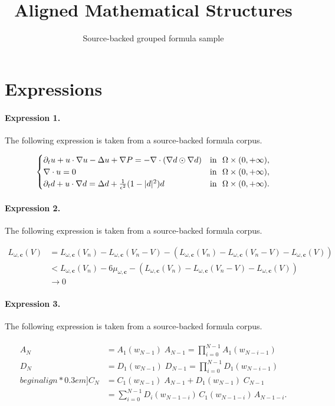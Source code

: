 \documentclass[11pt]{article}
\title{Aligned Mathematical Structures}
\author{Source-backed grouped formula sample}
\date{}
\begin{document}
\maketitle
\section{Expressions}
\paragraph{Expression 1.} The following expression is taken from a source-backed formula corpus.

\begin{align*}\begin{cases}\partial_t u+u\cdot\nabla u-\Delta u+\nabla P=-\nabla\cdot(\nabla d\odot \nabla d) & {\rm{in}}\ \ \Omega\times (0,+\infty),\\\nabla\cdot u = 0 & {\rm{in}}\ \ \Omega\times (0,+\infty),\\\partial_t d+u\cdot\nabla d=\Delta d+\frac{1}{\epsilon^2}(1-|d|^2) d & {\rm{in}}\ \ \Omega\times (0,+\infty).\end{cases}\end{align*}

\paragraph{Expression 2.} The following expression is taken from a source-backed formula corpus.

\begin{align*}L_{\omega,\mathbf{c}}(V)&=L_{\omega,\mathbf{c}}(V_n)-L_{\omega,\mathbf{c}}(V_n-V)-(L_{\omega,\mathbf{c}}(V_n)-L_{\omega,\mathbf{c}}(V_n-V)-L_{\omega,\mathbf{c}}(V))\\&<L_{\omega,\mathbf{c}}(V_n)-6\mu_{\omega,\mathbf{c}}-(L_{\omega,\mathbf{c}}(V_n)-L_{\omega,\mathbf{c}}(V_n-V)-L_{\omega,\mathbf{c}}(V))\\&\rightarrow 0\end{align*}

\paragraph{Expression 3.} The following expression is taken from a source-backed formula corpus.

\begin{align*} \begin{aligned}A_N &= A_1(w_{N-1})\;\! A_{N-1} = \prod_{i=0}^{N-1} A_1(w_{N-i-1}) \\D_N &= D_1(w_{N-1})\;\! D_{N-1} = \prod_{i=0}^{N-1} D_1(w_{N-i-1}) \\begin{align*}0.3em]C_N &= C_1(w_{N-1})\;\! A_{N-1} + D_1(w_{N-1})\;\! C_{N-1} \\&= \sum_{i=0}^{N-1} D_i(w_{N-1-i})\, C_1(w_{N-1-i}) \, A_{N-1-i} . \\\end{aligned} \end{align*}
\end{document}
